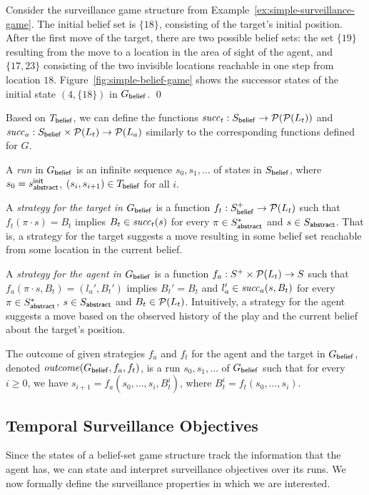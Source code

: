 \begin{example}\label{ex:simple-belief-game}
Consider the surveillance game structure from Example~\ref{ex:simple-surveillance-game}. The initial belief set is $\{18\}$, consisting of the target's initial position. After the first move of the target, there are two possible belief sets: the set $\{19\}$ resulting from the move to a location in the area of sight of the agent, and $\{17,23\}$ consisting of the two invisible locations reachable in one step from location $18$.
Figure~\ref{fig:simple-belief-game} shows the successor states of the initial state $(4,\{18\})$ in $G_{\mathsf{belief}}$. \qed
\end{example}

Based on  $T_{\mathsf{belief}}$, we can define the functions $\mathit{succ}_t : S_{\mathsf{belief}} \to \mathcal{P}(\mathcal{P}(L_t))$ and  $\mathit{succ}_a : S_{\mathsf{belief}} \times \mathcal{P}(L_t) \to \mathcal{P}(L_a)$ similarly to the corresponding functions defined for $G$. 

A \emph{run} in $G_{\mathsf{belief}}$ is an infinite sequence $s_0,s_1,\ldots$ of states in $S_{\mathsf{belief}}$, where $s_0 = s_{\mathsf{abstract}}^{\mathsf{init}}$,  $(s_i,s_{i+1}) \in T_{\mathsf{belief}}$ for all $i$. 

A \emph{strategy for the target in $G_{\mathsf{belief}}$} is a function $f_t: S_{\mathsf{belief}}^+ \to \mathcal{P}(L_t)$ such that $f_t(\pi\cdot s) = B_t$ implies $B_t \in \mathit{succ}_t(s)$ for every $\pi \in S_{\mathsf{abstract}}^*$ and $s \in S_{\mathsf{abstract}}$. That is, a strategy for the target suggests a move resulting in some belief set reachable from some location in the current belief.

A \emph{strategy for the agent in $G_{\mathsf{belief}}$} is a function $f_a : S^+ \times \mathcal{P}(L_t) \to S$ such that $f_a(\pi\cdot s,B_t) = (l_a',B_t')$ implies $B_t' = B_t$ and $l_a' \in \mathit{succ}_a(s,B_t)$ for every $\pi \in S_{\mathsf{abstract}}^*$, $s \in S_{\mathsf{abstract}}$ and $B_t \in \mathcal{P}(L_t)$. Intuitively, a strategy for the agent suggests a move based on the observed history of the play and the current belief about the target's position.

The outcome of given strategies $f_a$ and $f_t$ for the agent and the target in $G_{\mathsf{belief}}$, denoted $\mathit{outcome}(G_{\mathsf{belief}},f_a,f_t)$, is a run $s_0,s_1,\ldots$ of $G_{\mathsf{belief}}$ such that for every $i \geq 0$, we have $s_{i+1} = f_a(s_0,\ldots,s_i,B_t^i)$, where $B_t^i = f_t(s_0,\ldots,s_i)$.

\subsection{Temporal Surveillance Objectives}
Since the states of a belief-set game structure track the information that the agent has, we can state and interpret surveillance objectives over its runs. We now formally define the surveillance properties in which we are interested. 

